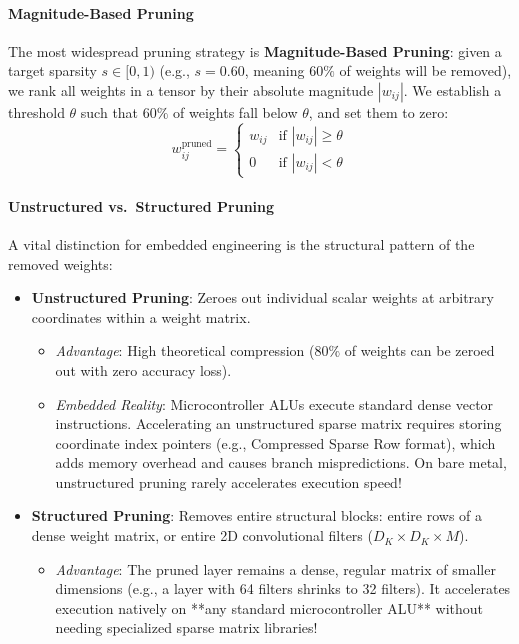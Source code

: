 \paragraph{Magnitude-Based Pruning}
The most widespread pruning strategy is \textbf{Magnitude-Based Pruning}: given a target sparsity $s \in [0, 1)$ (e.g., $s = 0.60$, meaning $60\%$ of weights will be removed), we rank all weights in a tensor by their absolute magnitude $|w_{ij}|$. We establish a threshold $\theta$ such that $60\%$ of weights fall below $\theta$, and set them to zero:
\begin{equation}
w_{ij}^{\text{pruned}} = \begin{cases}
w_{ij} & \text{if } |w_{ij}| \ge \theta \\
0 & \text{if } |w_{ij}| < \theta
\end{cases}\label{eq:magnitude_pruning}
\end{equation}

\paragraph{Unstructured vs.\ Structured Pruning}
A vital distinction for embedded engineering is the structural pattern of the removed weights:
\begin{itemize}
    \item \textbf{Unstructured Pruning}: Zeroes out individual scalar weights at arbitrary coordinates within a weight matrix.
    \begin{itemize}
        \item \emph{Advantage}: High theoretical compression ($80\%$ of weights can be zeroed out with zero accuracy loss).
        \item \emph{Embedded Reality}: Microcontroller ALUs execute standard dense vector instructions. Accelerating an unstructured sparse matrix requires storing coordinate index pointers (e.g., Compressed Sparse Row format), which adds memory overhead and causes branch mispredictions. On bare metal, unstructured pruning rarely accelerates execution speed!
    \end{itemize}
    \item \textbf{Structured Pruning}: Removes entire structural blocks: entire rows of a dense weight matrix, or entire 2D convolutional filters ($D_K \times D_K \times M$).
    \begin{itemize}
        \item \emph{Advantage}: The pruned layer remains a dense, regular matrix of smaller dimensions (e.g., a layer with 64 filters shrinks to 32 filters). It accelerates execution natively on **any standard microcontroller ALU** without needing specialized sparse matrix libraries!
    \end{itemize}
\end{itemize}

